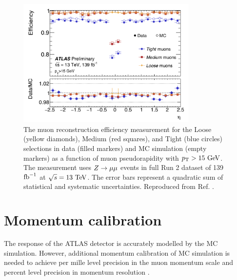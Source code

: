 \begin{figure}[h]
  \centering
  \includegraphics[width=0.8\textwidth]{figures/muons/reco_eff}
  \caption[Muon reconstruction efficiency]{The muon reconstruction
  efficiency measurement for the Loose (yellow diamonds), Medium
  (red squares), and Tight (blue circles) selections in data
  (filled markers) and MC simulation (empty markers) as a function
  of muon pseudorapidity with $p_{\text{T}} > 15~\text{Ge\kern -0.1em V}$. The measurement
  uses $Z \rightarrow \mu\mu$ events in full Run 2 dataset of 139 $\text{fb}^{-1}$
  at $\sqrt{s}=13~\text{Te\kern -0.1em V}$. The error bars represent a quadratic sum of
  statistical and systematic uncertainties. Reproduced from Ref.
  \cite{Junggeburth:2685295}.}
  \label{fig:muon:reco_eff}
\end{figure}

\section{Momentum calibration}
\label{sec:muons:calibration}

The response of the ATLAS detector is accurately modelled by the
MC simulation. However, additional momentum calibration of MC simulation
is needed to achieve per mille level precision in the muon momentum scale
and percent level precision in momentum resolution \cite{Aad:2016jkr}.

